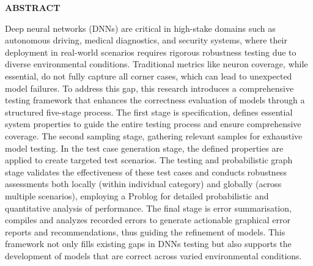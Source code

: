 
\begin{center}
{\fontsize{16}{15} \bf ABSTRACT}
\vspace{0.4cm}
\end{center}
\normalsize

Deep neural networks (DNNs) are critical in high-stake domains such as autonomous driving, medical diagnostics, and security systems, where their deployment in real-world scenarios requires rigorous robustness testing due to diverse environmental conditions. Traditional metrics like neuron coverage, while essential, do not fully capture all corner cases, which can lead to unexpected model failures. To address this gap, this research introduces a comprehensive testing framework that enhances the correctness evaluation of models through a structured five-stage process. The first stage is specification, defines essential system properties to guide the entire testing process and ensure comprehensive coverage. The second sampling stage, gathering relevant samples for exhaustive model testing. In the test case generation stage, the defined properties are applied to create targeted test scenarios. The testing and probabilistic graph stage validates the effectiveness of these test cases and conducts robustness assessments both locally (within individual category) and globally (across multiple scenarios), employing a Problog for detailed probabilistic and quantitative analysis of performance. The final stage is error summarisation, compiles and analyzes recorded errors to generate actionable graphical error reports and recommendations, thus guiding the refinement of models. This framework not only fills existing gaps in DNNs testing but also supports the development of models that are correct across varied environmental conditions.

\clearpage

